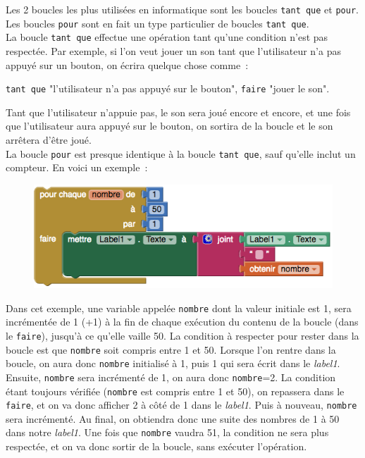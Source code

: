 \documentclass[12t,a4paper]{article}
\begin{document}
Les 2 boucles les plus utilisées en informatique sont les boucles \texttt{tant que} et \texttt{pour}. Les boucles \texttt{pour} sont en fait un type particulier de boucles \texttt{tant que}.\\

La boucle \texttt{tant que} effectue une opération tant qu'une condition n'est pas respectée. Par exemple, si l'on veut jouer un son tant que l'utilisateur n'a pas appuyé sur un bouton, on écrira quelque chose comme~:

\begin{center}
\texttt{tant que} "l'utilisateur n'a pas appuyé sur le bouton", \texttt{faire} "jouer le son".
\end{center}

Tant que l'utilisateur n'appuie pas, le son sera joué encore et encore, et une fois que l'utilisateur aura appuyé sur le bouton, on sortira de la boucle et le son arrêtera d'être joué. \\

La boucle \texttt{pour} est presque identique à la boucle \texttt{tant que}, sauf qu'elle inclut un compteur. En voici un exemple~: 

\begin{figure}[h!]
\centering
\includegraphics[scale=0.7]{forloop.png}
\end{figure}

Dans cet exemple, une variable appelée \texttt{nombre} dont la valeur initiale est 1, sera incrémentée de 1 (+1) à la fin de chaque exécution du contenu de la boucle (dans le \texttt{faire}), jusqu'à ce qu'elle vaille 50. La condition à respecter pour rester dans la boucle est que \texttt{nombre} soit compris entre 1 et 50.
Lorsque l'on rentre dans la boucle, on aura donc \texttt{nombre} initialisé à 1, puis 1 qui sera écrit dans le \textit{label1}. Ensuite, \texttt{nombre} sera incrémenté de 1, on aura donc \texttt{nombre}=2. La condition étant toujours vérifiée (\texttt{nombre} est compris entre 1 et 50), on repassera dans le \texttt{faire}, et on va donc afficher 2 à côté de 1 dans le \textit{label1}. Puis à nouveau, \texttt{nombre} sera incrémenté. Au final, on obtiendra donc une suite des nombres de 1 à 50 dans notre \textit{label1}. Une fois que \texttt{nombre} vaudra 51, la condition ne sera plus respectée, et on va donc sortir de la boucle, sans exécuter l'opération.
\end{document}
